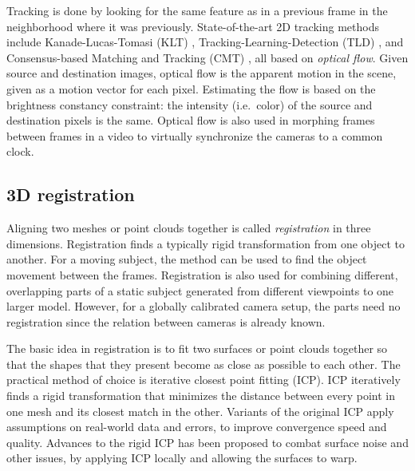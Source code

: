 Tracking is done by looking for the same feature as in a previous frame in the neighborhood where it was previously.
State-of-the-art 2D tracking methods include Kanade-Lucas-Tomasi (KLT) \cite{lucas1981iterative,tomasi1991detection}, Tracking-Learning-Detection (TLD) \cite{kalal2012tracking}, and Consensus-based Matching and Tracking (CMT) \cite{nebehay2014consensus}, all based on \emph{optical flow}.
\cite{horn1981determining,gibson1950perception,beauchemin1995computation}
Given source and destination images, optical flow is the apparent motion in the scene, given as a motion vector for each pixel.
Estimating the flow is based on the brightness constancy constraint: the intensity (i.e.\ color) of the source and destination pixels is the same. \cite{horn1974determining}
Optical flow is also used in morphing frames between frames in a video to virtually synchronize the cameras to a common clock. \cite{bradley2009synchronization}



\subsection{3D registration} %

Aligning two meshes or point clouds together is called \emph{registration} in three dimensions.
Registration finds a typically rigid transformation from one object to another.
\cite{zhang1994iterative,rusinkiewicz2001efficient}
For a moving subject, the method can be used to find the object movement between the frames.
\cite{pons2005modelling,zhao2005alignment}
Registration is also used for combining different, overlapping parts of a static subject generated from different viewpoints to one larger model.
\cite{eggert1998simultaneous,huber2003fully}
However, for a globally calibrated camera setup, the parts need no registration since the relation between cameras is already known.

The basic idea in registration is to fit two surfaces or point clouds together so that the shapes that they present become as close as possible to each other.
The practical method of choice is iterative closest point fitting (ICP).
ICP iteratively finds a rigid transformation that minimizes the distance between every point in one mesh and its closest match in the other.
Variants of the original ICP apply assumptions on real-world data and errors, to improve convergence speed and quality.
\cite{zhang1994iterative,rusinkiewicz2001efficient}
Advances to the rigid ICP has been proposed to combat surface noise and other issues, by applying ICP locally and allowing the surfaces to warp.
\cite{brown2007global}


